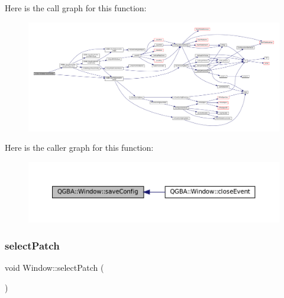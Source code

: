 Here is the call graph for this function\+:
\nopagebreak
\begin{figure}[H]
\begin{center}
\leavevmode
\includegraphics[width=350pt]{class_q_g_b_a_1_1_window_a9d31b6bc2ec42e500c9fa6370ec89f52_cgraph}
\end{center}
\end{figure}
Here is the caller graph for this function\+:
\nopagebreak
\begin{figure}[H]
\begin{center}
\leavevmode
\includegraphics[width=350pt]{class_q_g_b_a_1_1_window_a9d31b6bc2ec42e500c9fa6370ec89f52_icgraph}
\end{center}
\end{figure}
\mbox{\label{class_q_g_b_a_1_1_window_a46e83ed0f628884840257d9534a6fa29}} 
\subsubsection{\texorpdfstring{select\+Patch}{selectPatch}}
{\footnotesize\ttfamily void Window\+::select\+Patch (\begin{DoxyParamCaption}{ }\end{DoxyParamCaption})\hspace{0.3cm}{\ttfamily [slot]}}

